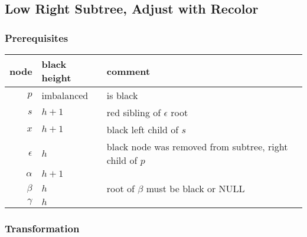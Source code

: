 \documentclass[a4paper,10pt,twoside]{article}
\begin{document}
\newpage
\subsection{Low Right Subtree, Adjust with Recolor}

\subsubsection{Prerequisites}

\begin{center}
\begin{tabular}{|r||l|l|}
\hline
node		&	black height	&	comment	\\
\hline
\hline
$p$		&	imbalanced	&	is black	\\\hline
$s$		&	$h+1$	&	red sibling of $\epsilon$ root	\\\hline
$x$		&	$h+1$	&	black left child of $s$	\\\hline
$\epsilon$	&	$h$	&	black node was removed from subtree, right child of $p$	\\\hline
$\alpha$	&	$h+1$	&		\\\hline
$\beta$		&	$h$	&	root of $\beta$ must be black or NULL	\\\hline
$\gamma$	&	$h$	&		\\\hline
\end{tabular}
\end{center}

\begin{center}
\end{center}

\subsubsection{Transformation}
\end{document}

